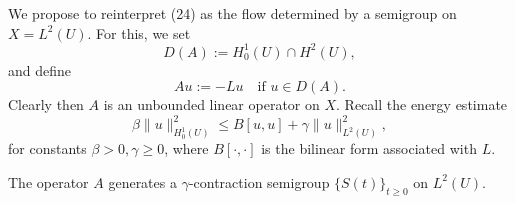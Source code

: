 We propose to reinterpret (24) as the flow determined by a semigroup on $X = L^2(U)$. For this, we set
\[
D(A) := H_0^1(U) \cap H^2(U),
\tag{25}
\]
and define
\[
Au := -Lu \quad \text{if } u \in D(A).
\tag{26}
\]
Clearly then $A$ is an unbounded linear operator on $X$. Recall the energy estimate
\[
\beta\|u\|_{H_0^1(U)}^2 \le B[u,u] + \gamma\|u\|_{L^2(U)}^2,
\tag{27}
\]
for constants $\beta > 0, \gamma \ge 0$, where $B[\cdot,\cdot]$ is the bilinear form associated with $L$.

\begin{theorem}
\label{thm:parabolic-pde-as-semigroup}
The operator $A$ generates a $\gamma$-contraction semigroup $\{S(t)\}_{t \ge 0}$ on $L^2(U)$.
\end{theorem}

